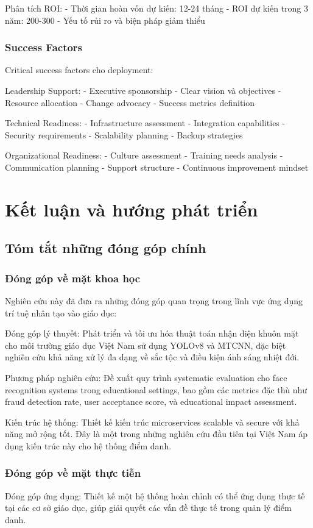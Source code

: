 \documentclass[12pt,a4paper]{report}
\begin{document}
Phân tích ROI:
- Thời gian hoàn vốn dự kiến: 12-24 tháng
- ROI dự kiến trong 3 năm: 200-300%
- Yếu tố rủi ro và biện pháp giảm thiểu

\subsection{Success Factors}
Critical success factors cho deployment:

Leadership Support:
- Executive sponsorship
- Clear vision và objectives
- Resource allocation
- Change advocacy
- Success metrics definition

Technical Readiness:
- Infrastructure assessment
- Integration capabilities
- Security requirements
- Scalability planning
- Backup strategies

Organizational Readiness:
- Culture assessment
- Training needs analysis
- Communication planning
- Support structure
- Continuous improvement mindset

\chapter{Kết luận và hướng phát triển}
\section{Tóm tắt những đóng góp chính}
\subsection{Đóng góp về mặt khoa học}
Nghiên cứu này đã đưa ra những đóng góp quan trọng trong lĩnh vực ứng dụng trí tuệ nhân tạo vào giáo dục:

Đóng góp lý thuyết: Phát triển và tối ưu hóa thuật toán nhận diện khuôn mặt cho môi trường giáo dục Việt Nam sử dụng YOLOv8 và MTCNN, đặc biệt nghiên cứu khả năng xử lý đa dạng về sắc tộc và điều kiện ánh sáng nhiệt đới.

Phương pháp nghiên cứu: Đề xuất quy trình systematic evaluation cho face recognition systems trong educational settings, bao gồm các metrics đặc thù như fraud detection rate, user acceptance score, và educational impact assessment.

Kiến trúc hệ thống: Thiết kế kiến trúc microservices scalable và secure với khả năng mở rộng tốt. Đây là một trong những nghiên cứu đầu tiên tại Việt Nam áp dụng kiến trúc này cho hệ thống điểm danh.

\subsection{Đóng góp về mặt thực tiễn}
Đóng góp ứng dụng: Thiết kế một hệ thống hoàn chỉnh có thể ứng dụng thực tế tại các cơ sở giáo dục, giúp giải quyết các vấn đề thực tế trong quản lý điểm danh.
\end{document}

